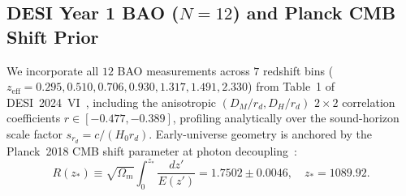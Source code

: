 \documentclass[10pt,twocolumn,a4paper]{article}
\begin{document}
\subsection{DESI Year 1 BAO ($N = 12$) and Planck CMB Shift Prior}
We incorporate all $12$ BAO measurements across $7$ redshift bins ($z_{\mathrm{eff}} = 0.295, 0.510, 0.706, 0.930, 1.317, 1.491, 2.330$) from Table~1 of DESI~2024~VI~\cite{desi2024}, including the anisotropic $(D_M/r_d, D_H/r_d)$ $2\times 2$ correlation coefficients $r \in [-0.477, -0.389]$, profiling analytically over the sound-horizon scale factor $s_{r_d} = c/(H_0 r_d)$. Early-universe geometry is anchored by the Planck~2018 CMB shift parameter at photon decoupling~\cite{chen2019}:
\begin{equation}
R(z_*) \equiv \sqrt{\Omega_m}\int_0^{z_*}\frac{dz'}{E(z')} = 1.7502 \pm 0.0046, \quad z_* = 1089.92.
\end{equation}
\end{document}

